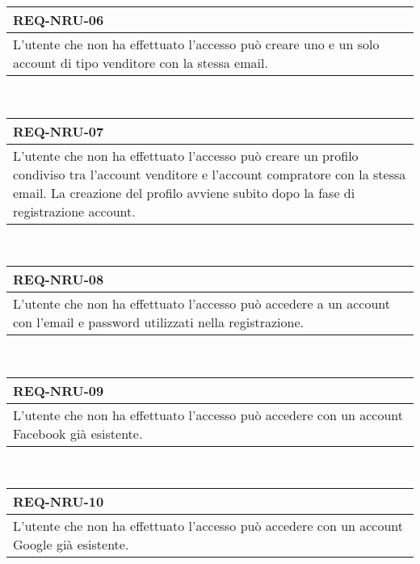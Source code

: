         \begin{tabular}{|p{}|}
            \hline
            \multicolumn{1}{|l|}{\cellcolor{head}\textbf{REQ-NRU-06}} \\
            \hline
            L'utente che non ha effettuato l'accesso può creare uno e un solo account di tipo venditore con la stessa email. \\
            \hline
        \end{tabular} \smallskip \\
        \begin{tabular}{|p{}|}
            \hline
            \multicolumn{1}{|l|}{\cellcolor{head}\textbf{REQ-NRU-07}} \\
            \hline
            L'utente che non ha effettuato l'accesso può creare un profilo condiviso tra l'account venditore e l'account compratore con la stessa email. La creazione del profilo avviene subito dopo la fase di registrazione account. \\
            \hline
        \end{tabular} \smallskip \\
        \begin{tabular}{|p{}|}
            \hline
            \multicolumn{1}{|l|}{\cellcolor{head}\textbf{REQ-NRU-08}} \\
            \hline
            L'utente che non ha effettuato l'accesso può accedere a un account con l'email e password utilizzati nella registrazione. \\
            \hline
        \end{tabular} \smallskip \\
        \begin{tabular}{|p{}|}
            \hline
            \multicolumn{1}{|l|}{\cellcolor{head}\textbf{REQ-NRU-09}} \\
            \hline
            L'utente che non ha effettuato l'accesso può accedere con un account Facebook già esistente. \\
            \hline
        \end{tabular} \smallskip \\
        \begin{tabular}{|p{}|}
            \hline
            \multicolumn{1}{|l|}{\cellcolor{head}\textbf{REQ-NRU-10}} \\
            \hline
            L'utente che non ha effettuato l'accesso può accedere con un account Google già esistente. \\
            \hline
        \end{tabular} \smallskip \\
